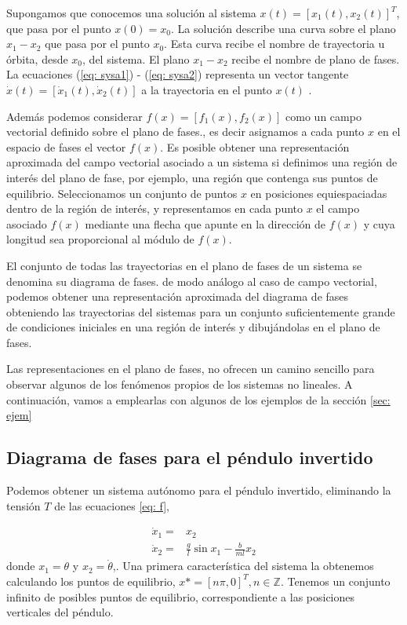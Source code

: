 Supongamos que conocemos una solución al sistema $x(t) = [x_1(t),x_2(t)]^T$, que pasa por el punto $x(0) = x_0$. La solución describe una curva sobre el plano $x_1-x_2$ que pasa por el punto $x_0$. Esta curva recibe el nombre de trayectoria u órbita, desde $x_0$, del sistema. El plano $x_1-x_2$ recibe el nombre de plano de fases. La ecuaciones (\ref{eq: sysa1}) - (\ref{eq: sysa2}) representa un vector tangente $\dot x(t) = [\dot x_1(t),\dot x_2(t)]$ a la trayectoria en el punto $x(t)$ .

Además podemos considerar $f(x)=[f_1(x),f_2(x)]$ como un campo vectorial definido sobre el plano de fases., es decir asignamos a cada punto $x$ en el espacio de fases el vector $f(x)$. Es posible obtener una representación aproximada del campo vectorial asociado a un sistema si definimos una región de interés del plano de fase, por ejemplo, una región que contenga sus puntos de equilibrio. Seleccionamos un conjunto de puntos $x$ en posiciones equiespaciadas dentro de la región de interés, y representamos en cada punto $x$ el campo asociado $f(x)$ mediante una flecha que apunte en la dirección de $f(x)$ y cuya longitud sea proporcional al módulo de $f(x)$.

El conjunto de todas las trayectorias en el plano de fases de un sistema se denomina su diagrama de fases. de modo análogo al caso de campo vectorial, podemos obtener una representación aproximada del diagrama de fases obteniendo las trayectorias del sistemas para un conjunto suficientemente grande de condiciones iniciales en una región de interés y dibujándolas en el plano de fases.

Las representaciones en el plano de fases, no ofrecen un camino sencillo para observar algunos de los fenómenos propios de los sistemas no lineales. A continuación, vamos a emplearlas con algunos de los ejemplos de la sección \ref{sec: ejem}

\subsection{Diagrama de fases para el péndulo invertido}
Podemos obtener un sistema autónomo para el péndulo invertido, eliminando la tensión $T$ de las ecuaciones \ref{eq: f},

\begin{align}
\dot x_1 = &x_2 \label{eq: pi1} \\ 
\dot x_2 = &\frac{g}{l}\sin x_1 - \frac{b}{ml}x_2 \label{eq: pi2}
\end{align}
donde $x_1 = \theta$ y $x_2 = \dot \theta$,. Una primera característica del sistema la obtenemos calculando los puntos de equilibrio, $x*=[n\pi,0]^T, n \in \mathbb{Z}$. Tenemos un conjunto infinito de posibles puntos de equilibrio, correspondiente a las posiciones verticales del péndulo.

